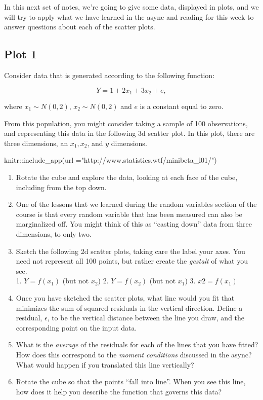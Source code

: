 \documentclass[
]{book}
\newenvironment{Shaded}{\begin{snugshade}}{\end{snugshade}}
\newcommand{\AttributeTok}[1]{\textcolor[rgb]{0.77,0.63,0.00}{#1}}
\newcommand{\FunctionTok}[1]{\textcolor[rgb]{0.00,0.00,0.00}{#1}}
\newcommand{\NormalTok}[1]{#1}
\newcommand{\SpecialCharTok}[1]{\textcolor[rgb]{0.00,0.00,0.00}{#1}}
\newcommand{\StringTok}[1]{\textcolor[rgb]{0.31,0.60,0.02}{#1}}
\providecommand{\tightlist}{%
  \setlength{\itemsep}{0pt}\setlength{\parskip}{0pt}}
\theoremstyle{definition}
\theoremstyle{definition}
\theoremstyle{definition}
\theoremstyle{definition}
\theoremstyle{remark}
\begin{document}
In this next set of notes, we're going to give some data, displayed in plots, and we will try to apply what we have learned in the async and reading for this week to answer questions about each of the scatter plots.

\hypertarget{plot-1}{%
\subsection{Plot 1}\label{plot-1}}

Consider data that is generated according to the following function:

\[
  Y = 1 + 2x_1 + 3x_2 + e, 
\]

where \(x_1 \sim N(0,2)\), \(x_2 \sim N(0,2)\) and \(e\) is a constant equal to zero.

From this population, you might consider taking a sample of 100 observations, and representing this data in the following 3d scatter plot. In this plot, there are three dimensions, an \(x_1, x_2\), and \(y\) dimensions.

\begin{Shaded}
\begin{Highlighting}[]
\NormalTok{knitr}\SpecialCharTok{::}\FunctionTok{include\_app}\NormalTok{(}\AttributeTok{url =}\StringTok{"http://www.statistics.wtf/minibeta\_l01/"}\NormalTok{)}
\end{Highlighting}
\end{Shaded}

\begin{enumerate}
\def\labelenumi{\arabic{enumi}.}
\tightlist
\item
  Rotate the cube and explore the data, looking at each face of the cube, including from the top down.
\item
  One of the lessons that we learned during the random variables section of the course is that every random variable that has been measured can also be marginalized off. You might think of this as ``casting down'' data from three dimensions, to only two.
\item
  Sketch the following 2d scatter plots, taking care the label your axes. You need not represent all 100 points, but rather create the \emph{gestalt} of what you see.\\
  1. \(Y = f(x_1)\) (but not \(x_2\))
  2. \(Y = f(x_2)\) (but not \(x_1\))
  3. \(x2 = f(x_1)\)
\item
  Once you have sketched the scatter plots, what line would you fit that minimizes the sum of squared residuals in the vertical direction. Define a residual, \(\epsilon\), to be the vertical distance between the line you draw, and the corresponding point on the input data.
\item
  What is the \emph{average} of the residuals for each of the lines that you have fitted? How does this correspond to the \emph{moment conditions} discussed in the async? What would happen if you translated this line vertically?
\item
  Rotate the cube so that the points ``fall into line''. When you see this line, how does it help you describe the function that governs this data?
\end{enumerate}
\end{document}
